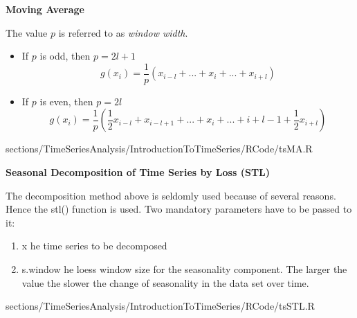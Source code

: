 		
		\RTheory
		{
			\textbf{Moving Average}
			
			\vfill
			
			The value $p$ is referred to as \textit{window width}. 

			\begin{itemize}
				\item  If $p$ is odd, then $p=2l + 1$
				$$ g(x_i)= \frac{1}{p}(x_{i-l}+...+x_i+...+x_{i+l})$$ 
				\item  If $p$ is even, then $p=2l$
				$$ g(x_i)= \frac{1}{p}(\frac{1}{2}x_{i-l}+x_{i-l+1}+...+x_i+...+{i+l-1}+\frac{1}{2}x_{i+l})$$ 
			\end{itemize}
		}
		{
			sections/TimeSeriesAnalysis/IntroductionToTimeSeries/RCode/tsMA.R
		}
		
		\RTheory
		{
			\textbf{Seasonal Decomposition of Time Series by Loss (STL)}
			
			\vfill
			
			The decomposition method above is seldomly used because of several reasons. Hence the {\color{blue}stl()} function is used. Two mandatory parameters have to be passed to it:
			
			\begin{enumerate}
				\item {\color{blue}x} he time series to be decomposed
				\item {\color{blue}s.window} he loess window size for the seasonality component. The larger the value the slower the change of seasonality in the data set over time.
			\end{enumerate}
		}
		{
			sections/TimeSeriesAnalysis/IntroductionToTimeSeries/RCode/tsSTL.R
		}
		
